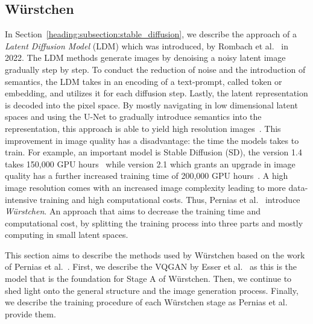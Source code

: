 \subsection{W\"urstchen}
In Section~\ref{heading:subsection:stable_diffusion}, we describe the approach
of a \emph{Latent Diffusion Model} (LDM) which was introduced,
by Rombach et al.~\cite{rombach2022stablediffusion} in 2022. The LDM methods
generate images by denoising a noisy latent image gradually step by step. To
conduct the reduction of noise and the introduction of semantics, the LDM takes
in an encoding of a text-prompt, called token or embedding, and utilizes it for
each diffusion step. Lastly, the latent representation is decoded into the
pixel space. By mostly navigating in low dimensional latent spaces and
using the U-Net to gradually introduce semantics into the representation, this
approach is able to yield high resolution images~\cite{rombach2022stablediffusion}.
This improvement in image quality has a disadvantage: the time the models takes
to train. For example, an important model is Stable Diffusion (SD), the version
1.4 takes 150,000 GPU hours~\cite{rombach2022sd_1_4} while version 2.1 which
grants an upgrade in image quality has a further increased training time of
200,000 GPU hours~\cite{rombach2023sd_2_1}. A high image resolution comes with
an increased image complexity leading to more data-intensive training and
high computational costs. Thus, Pernias et al.~\cite{pernias2024wrstchen}
introduce \emph{W\"urstchen}. An approach that aims to decrease the training
time and computational cost, by splitting the training process into three parts
and mostly computing in small latent spaces.

This section aims to describe the methods used by W\"urstchen based on the work
of Pernias et al.~\cite{pernias2024wrstchen}. First, we describe the VQGAN by
Esser et al.~\cite{esser2021tamingtransformershighresolutionimage} as this is
the model that is the foundation for Stage A of W\"urstchen. Then, we continue
to shed light onto the general structure and the image generation process. Finally, we
describe the training procedure of each W\"urstchen stage as Pernias et al.
provide them.
